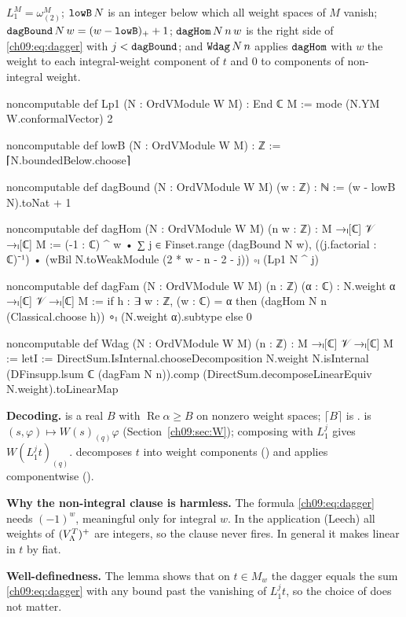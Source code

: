 \begin{definition}\label{ch09:def:Wdag}
$L_1^M=\omega^M_{(2)}$; $\lean{lowB}\,N$ is an integer below which all weight spaces of $M$ vanish;
$\lean{dagBound}\,N\,w=(w-\lean{lowB})_++1$; $\lean{dagHom}\,N\,n\,w$ is the right side of
\eqref{ch09:eq:dagger} with $j<\lean{dagBound}$; and $\lean{Wdag}\,N\,n$ applies $\lean{dagHom}$ with
$w$ the weight to each integral-weight component of $t$ and $0$ to components of non-integral weight.
\end{definition}
\begin{leancode}
noncomputable def Lp1 (N : OrdVModule W M) : End ℂ M := mode (N.YM W.conformalVector) 2

noncomputable def lowB (N : OrdVModule W M) : ℤ := ⌈N.boundedBelow.choose⌉

noncomputable def dagBound (N : OrdVModule W M) (w : ℤ) : ℕ := (w - lowB N).toNat + 1

noncomputable def dagHom (N : OrdVModule W M) (n w : ℤ) : M →ₗ[ℂ] 𝒱 →ₗ[ℂ] M :=
  (-1 : ℂ) ^ w • ∑ j ∈ Finset.range (dagBound N w),
    ((j.factorial : ℂ)⁻¹) • (wBil N.toWeakModule (2 * w - n - 2 - j)) ∘ₗ (Lp1 N ^ j)

noncomputable def dagFam (N : OrdVModule W M) (n : ℤ) (α : ℂ) :
    N.weight α →ₗ[ℂ] 𝒱 →ₗ[ℂ] M :=
  if h : ∃ w : ℤ, (w : ℂ) = α then (dagHom N n (Classical.choose h)) ∘ₗ (N.weight α).subtype
  else 0

noncomputable def Wdag (N : OrdVModule W M) (n : ℤ) : M →ₗ[ℂ] 𝒱 →ₗ[ℂ] M :=
  letI := DirectSum.IsInternal.chooseDecomposition N.weight N.isInternal
  (DFinsupp.lsum ℂ (dagFam N n)).comp (DirectSum.decomposeLinearEquiv N.weight).toLinearMap
\end{leancode}
\begin{dictionary}
\textbf{Decoding.}  is a real $B$ with $\operatorname{Re}\alpha\ge B$ on
nonzero weight spaces; $\lceil B\rceil$ is .  is
$(s,\varphi)\mapsto W(s)_{(q)}\varphi$ (Section~\ref{ch09:sec:W}); composing with $L_1^j$ gives
$W(L_1^jt)_{(q)}$.  decomposes $t$ into weight components ()
and applies  componentwise ().

\textbf{Why the non-integral clause is harmless.} The formula \eqref{ch09:eq:dagger} needs
$(-1)^w$, meaningful only for integral $w$. In the application (Leech) all weights of $(V_{\Lambda}^{T})^{+}$ are
integers, so the clause never fires. In general it makes  linear in $t$ by fiat.

\textbf{Well-definedness.} The lemma  shows that on $t\in M_w$ the dagger
equals the sum \eqref{ch09:eq:dagger} with any bound past the vanishing of $L_1^jt$, so the choice
of  does not matter.
\end{dictionary}

